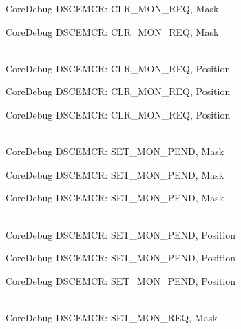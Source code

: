 \begin{DoxyRefList}
\label{deprecated__deprecated000523}%
%
Core\+Debug DSCEMCR:\+ CLR\+\_\+\+MON\+\_\+\+REQ, Mask 

\label{deprecated__deprecated000625}%
%
Core\+Debug DSCEMCR:\+ CLR\+\_\+\+MON\+\_\+\+REQ, Mask  
\item[{\parbox[t]{\linewidth}{Global \doxylink{group__CMSIS__SCB_ga1e2e3a310143f4663f1c415c03c3d535}{Core\+Debug\+\_\+\+DSCEMCR\+\_\+\+CLR\+\_\+\+MON\+\_\+\+REQ\+\_\+\+Pos} }}]\hfill \\
\label{deprecated__deprecated000071}%
%
Core\+Debug DSCEMCR:\+ CLR\+\_\+\+MON\+\_\+\+REQ, Position 

\label{deprecated__deprecated000522}%
%
Core\+Debug DSCEMCR:\+ CLR\+\_\+\+MON\+\_\+\+REQ, Position 

\label{deprecated__deprecated000624}%
%
Core\+Debug DSCEMCR:\+ CLR\+\_\+\+MON\+\_\+\+REQ, Position  
\item[{\parbox[t]{\linewidth}{Global \doxylink{group__CMSIS__SCB_ga575045239507b73f338bcbb959ac6904}{Core\+Debug\+\_\+\+DSCEMCR\+\_\+\+SET\+\_\+\+MON\+\_\+\+PEND\+\_\+\+Msk} }}]\hfill \\
\label{deprecated__deprecated000078}%
%
Core\+Debug DSCEMCR:\+ SET\+\_\+\+MON\+\_\+\+PEND, Mask 

\label{deprecated__deprecated000529}%
%
Core\+Debug DSCEMCR:\+ SET\+\_\+\+MON\+\_\+\+PEND, Mask 

\label{deprecated__deprecated000631}%
%
Core\+Debug DSCEMCR:\+ SET\+\_\+\+MON\+\_\+\+PEND, Mask  
\item[{\parbox[t]{\linewidth}{Global \doxylink{group__CMSIS__SCB_ga644ae3a13bcb9f2a80326bc5824f1b28}{Core\+Debug\+\_\+\+DSCEMCR\+\_\+\+SET\+\_\+\+MON\+\_\+\+PEND\+\_\+\+Pos} }}]\hfill \\
\label{deprecated__deprecated000077}%
%
Core\+Debug DSCEMCR:\+ SET\+\_\+\+MON\+\_\+\+PEND, Position 

\label{deprecated__deprecated000528}%
%
Core\+Debug DSCEMCR:\+ SET\+\_\+\+MON\+\_\+\+PEND, Position 

\label{deprecated__deprecated000630}%
%
Core\+Debug DSCEMCR:\+ SET\+\_\+\+MON\+\_\+\+PEND, Position  
\item[{\parbox[t]{\linewidth}{Global \doxylink{group__CMSIS__SCB_ga73d8960abbd67eeda64f27a77ed7baf2}{Core\+Debug\+\_\+\+DSCEMCR\+\_\+\+SET\+\_\+\+MON\+\_\+\+REQ\+\_\+\+Msk} }}]\hfill \\
\label{deprecated__deprecated000076}%
%
Core\+Debug DSCEMCR:\+ SET\+\_\+\+MON\+\_\+\+REQ, Mask 


\end{DoxyRefList}

